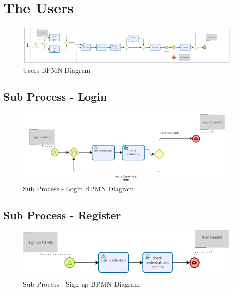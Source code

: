 \documentclass[a4paper,12pt]{report}
\begin{document}
\section{The Users}
\begin{figure}[H]
 \centering
\includegraphics[scale=0.16]{user_BPMN}
\caption{Users BPMN Diagram}
\label{Users BPMN}
\end{figure} 

\subsection{Sub Process - Login }
\begin{figure}[H]
 \centering
\includegraphics[scale=0.35]{login_BPMN}
\caption{Sub Process - Login BPMN Diagram}
\label{Login BPMN}

\end{figure} 

\subsection{Sub Process - Register }
\begin{figure}[H]
 \centering
\includegraphics[scale=0.35]{signup_BPMN}
\caption{Sub Process - Sign up BPMN Diagram}
\label{Signup BPMN}
\end{figure} 
\end{document}

